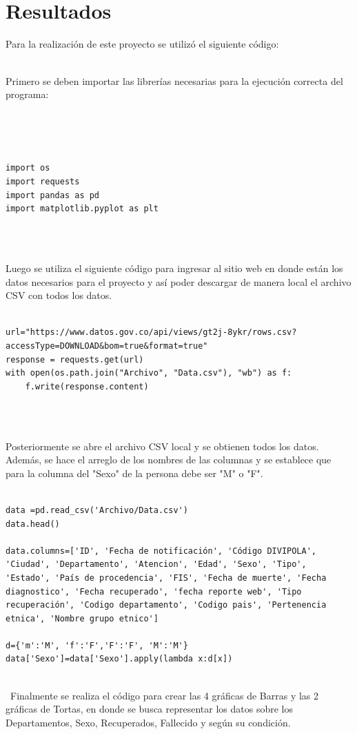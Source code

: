 \documentclass[conference,compsoc,onecolumn]{IEEEtran}
\begin{document}
\\\
\section{Resultados}
\label{sec:results}

Para la realización de este proyecto se utilizó el siguiente código:
\\\

Primero se deben importar las librerías necesarias para la ejecución correcta del programa:
\\\

\\\

\begin{lstlisting}
import os
import requests
import pandas as pd
import matplotlib.pyplot as plt

\end{lstlisting}
\\\

Luego se utiliza el siguiente código para ingresar al sitio web en donde están los datos necesarios para el proyecto y así poder descargar de manera local el archivo CSV con todos los datos.
\\\

\begin{lstlisting}
url="https://www.datos.gov.co/api/views/gt2j-8ykr/rows.csv?accessType=DOWNLOAD&bom=true&format=true"
response = requests.get(url)
with open(os.path.join("Archivo", "Data.csv"), "wb") as f:
    f.write(response.content)

\end{lstlisting}
\\\

Posteriormente se abre el archivo CSV local y se obtienen todos los datos. Además, se hace el arreglo de los nombres de las columnas y se establece que para la columna del "Sexo" de la persona debe ser "M" o "F".
\\\
\begin{lstlisting}
data =pd.read_csv('Archivo/Data.csv')
data.head()

data.columns=['ID', 'Fecha de notificación', 'Código DIVIPOLA', 'Ciudad', 'Departamento', 'Atencion', 'Edad', 'Sexo', 'Tipo', 'Estado', 'País de procedencia', 'FIS', 'Fecha de muerte', 'Fecha diagnostico', 'Fecha recuperado', 'fecha reporte web', 'Tipo recuperación', 'Codigo departamento', 'Codigo pais', 'Pertenencia etnica', 'Nombre grupo etnico']

d={'m':'M', 'f':'F','F':'F', 'M':'M'}
data['Sexo']=data['Sexo'].apply(lambda x:d[x])
\end{lstlisting}
\\\
Finalmente se realiza el código para crear las 4 gráficas de Barras y las 2 gráficas de Tortas, en donde se busca representar los datos sobre los Departamentos, Sexo, Recuperados, Fallecido y según su condición.
\\\
\end{document}
